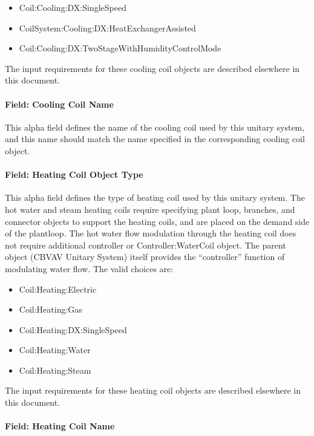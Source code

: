 \begin{itemize}
\item
  Coil:Cooling:DX:SingleSpeed
\item
  CoilSystem:Cooling:DX:HeatExchangerAssisted
\item
  Coil:Cooling:DX:TwoStageWithHumidityControlMode
\end{itemize}

The input requirements for these cooling coil objects are described elsewhere in this document.

\paragraph{Field: Cooling Coil Name}\label{field-cooling-coil-name-6}

This alpha field defines the name of the cooling coil used by this unitary system, and this name should match the name specified in the corresponding cooling coil object.

\paragraph{Field: Heating Coil Object Type}\label{field-heating-coil-object-type-8}

This alpha field defines the type of heating coil used by this unitary system. The hot water and steam heating coils require specifying plant loop, branches, and connector objects to support the heating coils, and are placed on the demand side of the plantloop. The hot water flow modulation through the heating coil does not require additional controller or Controller:WaterCoil object. The parent object (CBVAV Unitary System) itself provides the ``controller'' function of modulating water flow. The valid choices are:

\begin{itemize}
\item
  Coil:Heating:Electric
\item
  Coil:Heating:Gas
\item
  Coil:Heating:DX:SingleSpeed
\item
  Coil:Heating:Water
\item
  Coil:Heating:Steam
\end{itemize}

The input requirements for these heating coil objects are described elsewhere in this document.

\paragraph{Field: Heating Coil Name}\label{field-heating-coil-name-8}

